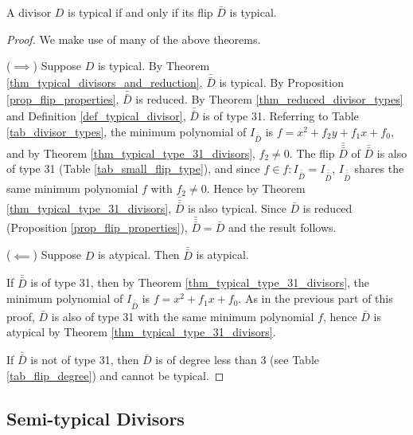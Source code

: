 \begin{theorem}
  A divisor $D$ is typical if and only if its flip $\bar D$ is typical.
\end{theorem}
\begin{proof}
  We make use of many of the above theorems.
  
  ($\implies$)
  Suppose $D$ is typical.
  By Theorem \ref{thm_typical_divisors_and_reduction}, $\bar{\bar D}$ is typical.
  By Proposition \ref{prop_flip_properties}, $\bar{\bar D}$ is reduced.
  By Theorem \ref{thm_reduced_divisor_types} and Definition \ref{def_typical_divisor},
  $\bar{\bar D}$ is of type 31.
  Referring to Table \ref{tab_divisor_types},
  the minimum polynomial of $I_{\bar{\bar D}}$ is $f = x^2 + f_2y + f_1x + f_0$,
  and by Theorem \ref{thm_typical_type_31_divisors}, $f_2 \neq 0$.
  The flip $\bar{\bar{\bar D}}$ of $\bar{\bar D}$ is also of type 31 (Table \ref{tab_small_flip_type}),
  and since $f \in f : I_{\bar{\bar D}} = I_{\bar{\bar{\bar D}}}$,
  $I_{\bar{\bar{\bar D}}}$ shares the same minimum polynomial $f$ with $f_2 \neq 0$.
  Hence by Theorem \ref{thm_typical_type_31_divisors}, $\bar{\bar{\bar D}}$ is also typical.
  Since $\bar D$ is reduced (Proposition \ref{prop_flip_properties}),
  $\bar{\bar{\bar D}} = \bar D$ and the result follows.

  ($\impliedby$)
  Suppose $D$ is atypical.
  Then $\bar{\bar D}$ is atypical.
  
  If $\bar{\bar D}$ is of type 31, then by Theorem \ref{thm_typical_type_31_divisors},
  the minimum polynomial of $I_{\bar{\bar D}}$ is $f = x^2 + f_1x + f_0$.
  As in the previous part of this proof, $\bar D$ is also of type 31 with the same minimum polynomial $f$,
  hence $\bar D$ is atypical by Theorem \ref{thm_typical_type_31_divisors}.
  
  If $\bar{\bar D}$ is not of type 31, then $\bar D$ is of degree less than 3 (see Table \ref{tab_flip_degree})
  and cannot be typical.
\end{proof}




\subsection{Semi-typical Divisors}
\label{sec_semitypical_divisors}

